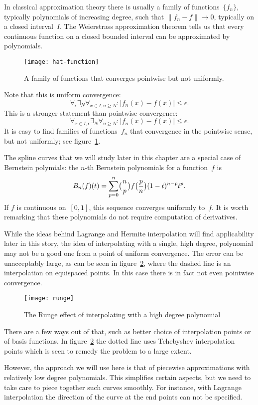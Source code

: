 In classical approximation theory there is usually a family of
functions~$\{f_n\}$, typically polynomials of increasing degree, such
that $\|f_n-f\|\rightarrow0$, typically on a closed interval~$I$. The
Weierstrass approximation theorem tells us that every continuous
function on a closed bounded interval can be approximated by
polynomials.

\begin{figure}[t]
\texttt{[image: hat-function]}
\caption{A family of functions that converges pointwise but not
  uniformly.}
\label{fig:hatfunc}
\end{figure}
Note that this is uniform convergence:
\[ \forall_\epsilon\exists_N\forall_{x\in I,n\geq N}:
    \left|f_n(x)-f(x)\right|\leq\epsilon.
\]
This is a stronger statement than pointwise convergence:
\[ \forall_{x\in I,\epsilon}\exists_N\forall_{n\geq N}:
    \left|f_n(x)-f(x)\right|\leq\epsilon.
\]
It is easy to find families of functions~$f_n$ that convergence in the
pointwise sense, but not uniformly; see figure~\ref{fig:hatfunc}.

The spline curves that we will study later in this chapter are a
special case of Bernstein polymials: the $n$-th Bernstein polynomials
for a function~$f$ is
\[ B_n(f)(t) = \sum_{p=0}^n \bigl({n\atop p}\bigr)
    f\bigl({p\over n}\bigr)(1-t)^{n-p}t^p. 
\]
If $f$ is continuous on~$[0,1]$, this sequence converges uniformly
to~$f$. It is worth remarking that these polynomials do not require
computation of derivatives.

While the ideas behind Lagrange and Hermite interpolation will find
applicability later in this story, the idea of interpolating with a
single, high degree, polynomial may not be a good one from a point of
uniform convergence. The error can
be unacceptably large, as can be seen in figure~\ref{fig:runge}, where
the dashed line is an interpolation on equispaced points. In this case
there is in fact not even pointwise convergence.
\begin{figure}[t]
\texttt{[image: runge]}
\caption{The Runge effect of interpolating with a high degree polynomial}
\label{fig:runge}
\end{figure}
There are a few ways out of that, such as
better choice of interpolation points or of basis functions.
In figure~\ref{fig:runge} the dotted line uses Tchebyshev
interpolation points which is seen to remedy the problem to a large
extent.

However, the approach we will use here is that of piecewise
approximations with relatively low degree polynomials. This simplifies
certain aspects, but we need to take care to piece together such
curves smoothly.  For instance, with Lagrange interpolation the
direction of the curve at the end points can not be specified.

